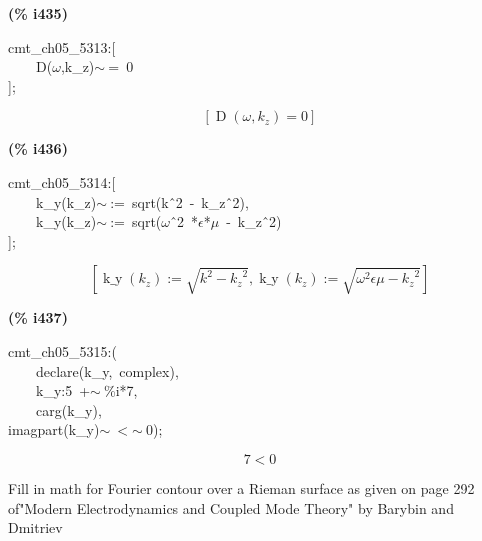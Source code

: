 \documentclass[fleqn]{article}
\begin{document}
\noindent
\begin{minipage}[t]{4.000000em}\color{red}\bfseries
(\% i435)	
\end{minipage}
\begin{minipage}[t]{\textwidth}\color{blue}
cmt\_ch05\_5313:[\\
\ \ \ \ D(\ensuremath{\omega},k\_z)\ensuremath{\sim\ }=\ 0\\
];
\end{minipage}
\[\displaystyle \tag{\% o435} 
\left[ \operatorname{D}\left( \omega \operatorname{,}{k_z}\right) =0\right] \mbox{}
\]


\noindent
\begin{minipage}[t]{4.000000em}\color{red}\bfseries
(\% i436)	
\end{minipage}
\begin{minipage}[t]{\textwidth}\color{blue}
cmt\_ch05\_5314:[\\
\ \ \ \ k\_y(k\_z)\ensuremath{\sim\ }:=\ sqrt(k\^\ 2\ -\ k\_z\^\ 2),\\
\ \ \ \ k\_y(k\_z)\ensuremath{\sim\ }:=\ sqrt(\ensuremath{\omega}\^\ 2\ *\ensuremath{\epsilon}*\ensuremath{\mu}\ -\ k\_z\^\ 2)\\
];
\end{minipage}
\[\displaystyle \tag{\% o436} 
\left[ \operatorname{k\_ y}\left( {k_z}\right) \operatorname{:=}\sqrt{{{k}^{2}}-{{{k_z}}^{2}}}\operatorname{,}\operatorname{k\_ y}\left( {k_z}\right) \operatorname{:=}\sqrt{{{\omega }^{2}} \epsilon  \mu -{{{k_z}}^{2}}}\right] \mbox{}
\]


\noindent
\begin{minipage}[t]{4.000000em}\color{red}\bfseries
(\% i437)	
\end{minipage}
\begin{minipage}[t]{\textwidth}\color{blue}
cmt\_ch05\_5315:(\\
\ \ \ \ declare(k\_y,\ complex),\\
\ \ \ \ k\_y:5\ +\ensuremath{\sim\ }\%i*7,\\
\ \ \ \ carg(k\_y),\\
imagpart(k\_y)\ensuremath{\sim\ }\ensuremath{<}\ensuremath{\sim\ }0);
\end{minipage}
\[\displaystyle \tag{\% o437} 
7\operatorname{<  }0\mbox{}
\]

Fill in math for Fourier contour over a Rieman surface as given on page 292 of"Modern Electrodynamics and Coupled Mode Theory" by Barybin and Dmitriev
\end{document}

